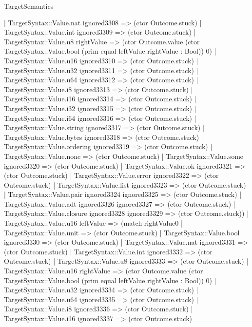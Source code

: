 \begin{lexlean}{TargetSemantics}
\begin{semanticmodule}
{              | TargetSyntax::Value.nat ignored3308 => (ctor Outcome.stuck)
              | TargetSyntax::Value.int ignored3309 => (ctor Outcome.stuck)
              | TargetSyntax::Value.u8 rightValue => (ctor Outcome.value (ctor TargetSyntax::Value.bool (prim equal leftValue rightValue : Bool)) 0)
              | TargetSyntax::Value.u16 ignored3310 => (ctor Outcome.stuck)
              | TargetSyntax::Value.u32 ignored3311 => (ctor Outcome.stuck)
              | TargetSyntax::Value.u64 ignored3312 => (ctor Outcome.stuck)
              | TargetSyntax::Value.i8 ignored3313 => (ctor Outcome.stuck)
              | TargetSyntax::Value.i16 ignored3314 => (ctor Outcome.stuck)
              | TargetSyntax::Value.i32 ignored3315 => (ctor Outcome.stuck)
              | TargetSyntax::Value.i64 ignored3316 => (ctor Outcome.stuck)
              | TargetSyntax::Value.string ignored3317 => (ctor Outcome.stuck)
              | TargetSyntax::Value.bytes ignored3318 => (ctor Outcome.stuck)
              | TargetSyntax::Value.ordering ignored3319 => (ctor Outcome.stuck)
              | TargetSyntax::Value.none => (ctor Outcome.stuck)
              | TargetSyntax::Value.some ignored3320 => (ctor Outcome.stuck)
              | TargetSyntax::Value.ok ignored3321 => (ctor Outcome.stuck)
              | TargetSyntax::Value.error ignored3322 => (ctor Outcome.stuck)
              | TargetSyntax::Value.list ignored3323 => (ctor Outcome.stuck)
              | TargetSyntax::Value.pair ignored3324 ignored3325 => (ctor Outcome.stuck)
              | TargetSyntax::Value.adt ignored3326 ignored3327 => (ctor Outcome.stuck)
              | TargetSyntax::Value.closure ignored3328 ignored3329 => (ctor Outcome.stuck))
            | TargetSyntax::Value.u16 leftValue => (match rightValue0
              | TargetSyntax::Value.unit => (ctor Outcome.stuck)
              | TargetSyntax::Value.bool ignored3330 => (ctor Outcome.stuck)
              | TargetSyntax::Value.nat ignored3331 => (ctor Outcome.stuck)
              | TargetSyntax::Value.int ignored3332 => (ctor Outcome.stuck)
              | TargetSyntax::Value.u8 ignored3333 => (ctor Outcome.stuck)
              | TargetSyntax::Value.u16 rightValue => (ctor Outcome.value (ctor TargetSyntax::Value.bool (prim equal leftValue rightValue : Bool)) 0)
              | TargetSyntax::Value.u32 ignored3334 => (ctor Outcome.stuck)
              | TargetSyntax::Value.u64 ignored3335 => (ctor Outcome.stuck)
              | TargetSyntax::Value.i8 ignored3336 => (ctor Outcome.stuck)
              | TargetSyntax::Value.i16 ignored3337 => (ctor Outcome.stuck)
}
\end{semanticmodule}
\end{lexlean}
